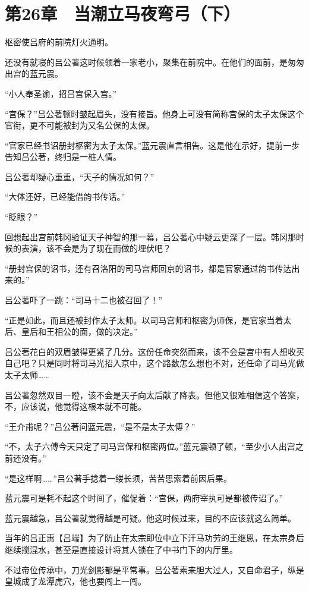 \section{第26章　当潮立马夜弯弓（下）}

枢密使吕府的前院灯火通明。

还没有就寝的吕公著这时候领着一家老小，聚集在前院中。在他们的面前，是匆匆出宫的蓝元震。

“小人奉圣谕，招吕宫保入宫。”

“宫保？”吕公著顿时皱起眉头，没有接旨。他身上可没有简称宫保的太子太保这个官衔，更不可能被封为又名公保的太保。

“官家已经书诏册封枢密为太子太保。”蓝元震直言相告。这是他在示好，提前一步告知吕公著，终归是一桩人情。

吕公著却疑心重重，“天子的情况如何？”

“大体还好，已经能借韵书传话。”

“眨眼？”

回想起出宫前韩冈验证天子神智的那一幕，吕公著心中疑云更深了一层。韩冈那时候的表演，该不会是为了现在而做的埋伏吧？

“册封宫保的诏书，还有召洛阳的司马宫师回京的诏书，都是官家通过韵书传达出来的。”

吕公著吓了一跳：“司马十二也被召回了！”

“正是如此，而且还被封作太子太师。以司马宫师和枢密为师保，是官家当着太后、皇后和王相公的面，做的决定。”

吕公著花白的双眉皱得更紧了几分。这份任命突然而来，该不会是宫中有人想收买自己吧？只是同时将司马光招入京中，这个路数怎么想也不对，还任命了司马光做太子太师……

吕公著忽然双目一瞪，该不会是天子向太后献了降表。但他又很难相信这个答案，不，应该说，他觉得这根本就不可能。

“王介甫呢？”吕公著问蓝元震，“是不是太子太傅？”

“不，太子六傅今天只定了司马宫保和枢密两位。”蓝元震顿了顿，“至少小人出宫之前还没有。”

“是这样啊……”吕公著手捻着一缕长须，苦苦思索着前因后果。

蓝元震可是耗不起这个时间了，催促着：“宫保，两府宰执可是都被传诏了。”

蓝元震越急，吕公著就觉得越是可疑。他这时候过来，目的不应该就这么简单。

当年的吕正惠【吕端】为了防止在太宗即位中立下汗马功劳的王继恩，在太宗身后继续搅混水，甚至是直接设计将其人锁在了中书门下的内厅里。

不过帝位传承中，刀光剑影都是平常事。吕公著素来胆大过人，又自命君子，纵是皇城成了龙潭虎穴，他也要闯上一闯。

